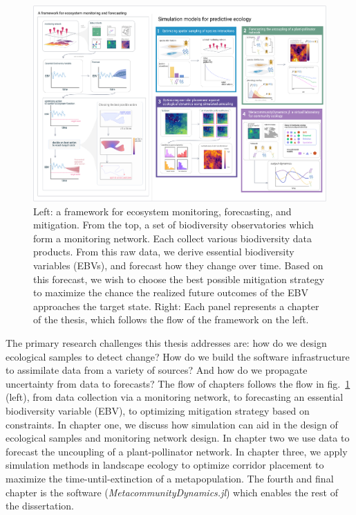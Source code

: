 \documentclass[11pt]{article}
\makeatletter
\def\maxwidth{\ifdim\Gin@nat@width>\linewidth\linewidth
\else\Gin@nat@width\fi}
\let\Oldincludegraphics\includegraphics
\renewcommand{\includegraphics}[1]{\Oldincludegraphics[width=\maxwidth]{#1}}
\makeatother
\begin{document}
\begin{figure}
\hypertarget{fig:thesis}{%
\centering
\includegraphics{./figures/thesisconcept.png}
\caption{Left: a framework for ecosystem monitoring, forecasting, and
mitigation. From the top, a set of biodiversity observatories which form
a monitoring network. Each collect various biodiversity data products.
From this raw data, we derive essential biodiversity variables (EBVs),
and forecast how they change over time. Based on this forecast, we wish
to choose the best possible mitigation strategy to maximize the chance
the realized future outcomes of the EBV approaches the target state.
Right: Each panel represents a chapter of the thesis, which follows the
flow of the framework on the left.}\label{fig:thesis}
}
\end{figure}

The primary research challenges this thesis addresses are: how do we
design ecological samples to detect change? How do we build the software
infrastructure to assimilate data from a variety of sources? And how do
we propagate uncertainty from data to forecasts? The flow of chapters
follows the flow in fig.~\ref{fig:thesis} (left), from data collection
via a monitoring network, to forecasting an essential biodiversity
variable (EBV), to optimizing mitigation strategy based on constraints.
In chapter one, we discuss how simulation can aid in the design of
ecological samples and monitoring network design. In chapter two we use
data to forecast the uncoupling of a plant-pollinator network. In
chapter three, we apply simulation methods in landscape ecology to
optimize corridor placement to maximize the time-until-extinction of a
metapopulation. The fourth and final chapter is the software
(\emph{MetacommunityDynamics.jl}) which enables the rest of the
dissertation.
\end{document}
